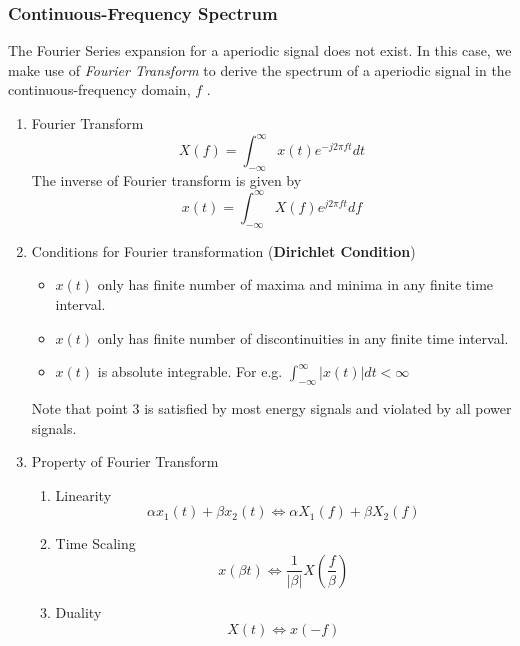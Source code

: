\documentclass{article}
\begin{document}
\subsubsection{Continuous-Frequency Spectrum} 
The Fourier Series expansion for a aperiodic signal does not exist. In this case, we make use of \textit{Fourier Transform} to derive the spectrum of a aperiodic signal in the continuous-frequency domain, $f$ .
\begin{enumerate}
    \item Fourier Transform \\
    \begin{equation}
        X(f) = \int^{\infty}_{-\infty}x(t)e^{-j2\pi ft}dt
    \end{equation}
    The inverse of Fourier transform is given by
    \begin{equation}
        x(t) = \int^{\infty}_{-\infty}X(f)e^{j2\pi ft}df
    \end{equation}
    \item Conditions for Fourier transformation (\textbf{Dirichlet Condition})
    \begin{itemize}
        \item $x(t)$ only has finite number of maxima and minima in any finite time interval.
        \item $x(t)$ only has finite number of discontinuities in any finite time interval.
        \item $x(t)$ is absolute integrable. For e.g. $\int^{\infty}_{-\infty}|x(t)| dt < \infty$
    \end{itemize}
    Note that point 3 is satisfied by most energy signals and violated by all power signals.
    \item Property of Fourier Transform
    \begin{enumerate}
        \item Linearity
        \begin{equation}
            \alpha x_1(t)+\beta x_2(t) \Longleftrightarrow \alpha X_1(f) + \beta X_2(f)
        \end{equation}
        \item Time Scaling
        \begin{equation}
            x(\beta t) \Longleftrightarrow \frac{1}{|\beta|}X(\frac{f}{\beta})
        \end{equation}
        \item Duality
        \begin{equation}
            X(t) \Longleftrightarrow x(-f)
        \end{equation}

\end{enumerate}
\end{enumerate}
\end{document}
